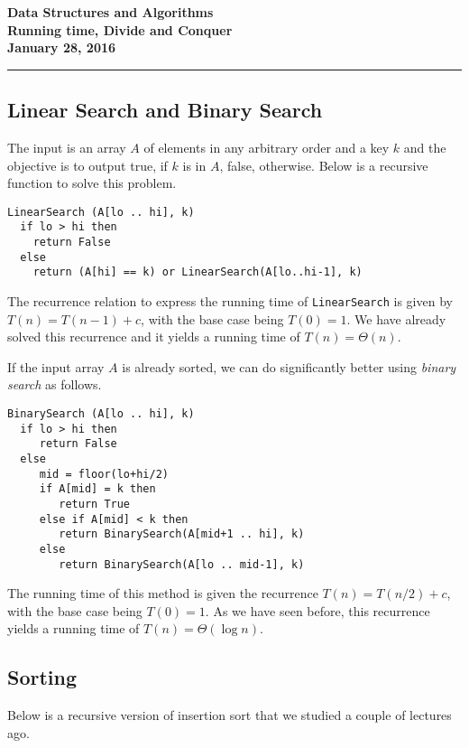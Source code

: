 \documentclass[11pt,twoside]{article}
\newcommand{\coursetitle}{Data Structures and Algorithms}
\newcommand{\docdate}{January 28, 2016}
\newcommand{\duedate}{January 28, 2016}
\newcommand{\doctitle}{Running time, Divide and Conquer}
\newcommand{\student}{PUT YOUR NAME HERE}
\begin{document}
\thispagestyle{empty}

\begin{center}
\Large\bf\coursetitle\\[2pt]\doctitle\\ \large\docdate
\end{center}
\vspace*{0.10in}

\hrule

\subsection*{Linear Search and Binary Search} 
The input is an array $A$ of elements in any arbitrary order and a key $k$
and the objective is to output true, if $k$ is in $A$, false,
otherwise. Below is a recursive function to solve this problem.

\begin{verbatim}
LinearSearch (A[lo .. hi], k)
  if lo > hi then
    return False
  else
    return (A[hi] == k) or LinearSearch(A[lo..hi-1], k)
\end{verbatim}
The recurrence relation to express the running time of
\texttt{LinearSearch} is given by $T(n) = T(n-1)+c$, with the base
case being $T(0)=1$. We have already solved this recurrence and it
yields a running time of $T(n)=\Theta(n)$.

If the input array $A$ is already sorted, we can do significantly
better using \textit{binary search} as follows. 

\begin{verbatim}
BinarySearch (A[lo .. hi], k)
  if lo > hi then
     return False
  else 
     mid = floor(lo+hi/2)
     if A[mid] = k then
        return True
     else if A[mid] < k then
        return BinarySearch(A[mid+1 .. hi], k)
     else 
        return BinarySearch(A[lo .. mid-1], k) 
\end{verbatim}

The running
time of this method is given the recurrence $T(n)=T(n/2)+c$, with the
base case being $T(0)=1$. As we have seen before, this recurrence
yields a running time of $T(n)=\Theta(\log n)$.

\subsection*{Sorting}
Below is a recursive version of insertion sort that we studied a
couple of lectures ago.
\end{document}
